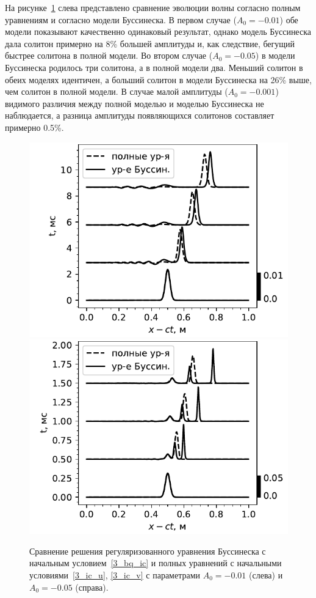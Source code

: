 \documentclass[12pt, a4paper]{report}
\begin{document}
На рисунке~\ref{fig:evol_compare} слева представлено сравнение эволюции волны согласно полным уравнениям и согласно модели Буссинеска.
В первом случае ($A_0=-0.01$) обе модели показывают качественно одинаковый результат, однако модель Буссинеска дала солитон примерно на 8\% большей амплитуды и, как следствие, бегущий быстрее солитона в полной модели. Во втором случае ($A_0=-0.05$) в модели Буссинеска родилось три солитона, а в полной модели два. Меньший солитон в обеих моделях идентичен, а больший солитон в модели Буссинеска на 26\% выше, чем солитон в полной модели. В случае малой амплитуды ($A_0=-0.001$) видимого различия между полной моделью и моделью Буссинеска не наблюдается, а разница амплитуды появляющихся солитонов составляет примерно 0.5\%.
\begin{figure}[h]
	\centering
	\includegraphics[width=0.49\linewidth]{figures/SolEvolCompareSmallBlack}
	\includegraphics[width=0.49\linewidth]{figures/SolEvolCompareSmallBlack2}
	\caption{Сравнение решения регуляризованного уравнения Буссинеска с начальным  условием~\eqref{3_bq_ic} и полных уравнений с начальными  условиями~\eqref{3_ic_u}, \eqref{3_ic_v} с параметрами $A_0=-0.01$ (слева) и $A_0=-0.05$ (справа).}
	\label{fig:evol_compare}
\end{figure}
\end{document}
